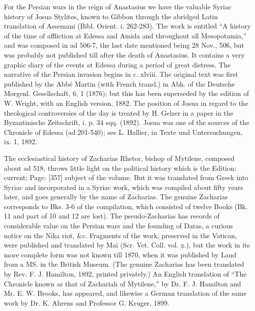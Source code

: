For the Persian wars in the reign of Anastasius we have the valuable Syriac history of Josua Stylites, known to Gibbon through the abridged Latin translation of Assemani (Bibl. Orient. i. 262-283). The work is entitled \texthebrew{“}A history of the time of affliction at Edessa and Amida and throughout all Mesopotamia,\texthebrew{}” and was composed in ad 506-7, the last date mentioned being 28 Nov., 506, but was probably not published till after the death of Anastasius. It contains a very graphic diary of the events at Edessa during a period of great distress. The narrative of the Persian invasion begins in c. xlviii. The original text was first published by the Abbé Martin (with French transl.) in Abh. of the Deutsche Morgenl. Gesellschaft, 6, 1 (1876); but this has been superseded by the edition of W. Wright, with an English version, 1882. The position of Josua in regard to the theological controversies of the day is treated by H. Gelzer in a paper in the Byzantinische Zeitschrift, i. p. 34 sqq. (1892). Josua was one of the sources of the Chronicle of Edessa (ad 201-540); see L. Hallier, in Texte und Untersuchungen, ix. 1, 1892.

The ecclesiastical history of Zacharias Rhetor, bishop of Mytilene, composed about ad 518, throws little light on the political history which is the Edition: current; Page: [357] subject of the volume. But it was translated from Greek into Syriac and incorporated in a Syriac work, which was compiled about fifty years later, and goes generally by the name of Zacharias. The genuine Zacharias corresponds to Bks. 3-6 of the compilation, which consisted of twelve Books (Bk. 11 and part of 10 and 12 are lost). The pseudo-Zacharias has records of considerable value on the Persian wars and the founding of Daras, a curious notice on the Nika riot, \&c. Fragments of the work, preserved in the Vatican, were published and translated by Mai (Scr. Vet. Coll. vol. x.), but the work in its more complete form was not known till 1870, when it was published by Land from a MS. in the British Museum. (The genuine Zacharias has been translated by Rev. F. J. Hamilton, 1892, printed privately.) An English translation of \texthebrew{“}The Chronicle known as that of Zachariah of Mytilene,\texthebrew{}” by Dr. F. J. Hamilton and Mr. E. W. Brooks, has appeared, and likewise a German translation of the same work by Dr. K. Ahrens and Professor G. Kruger, 1899.

